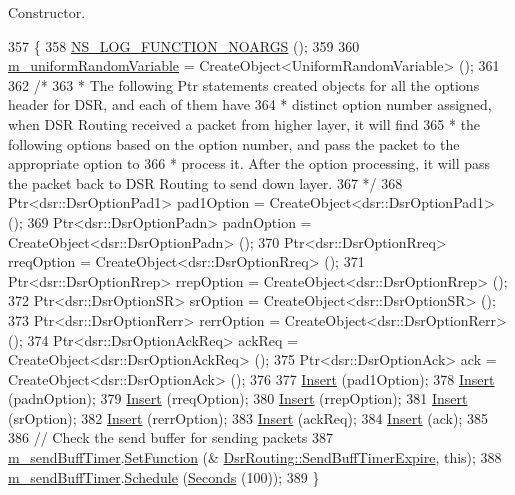 Constructor. 


\begin{DoxyCode}
357 \{
358   \hyperlink{log-macros-disabled_8h_a8f7e4afc291c9d29a65c18ac1f79197b}{NS\_LOG\_FUNCTION\_NOARGS} ();
359 
360   \hyperlink{classns3_1_1dsr_1_1DsrRouting_a22a85b3510166ffdd451e4010f996f0f}{m\_uniformRandomVariable} = CreateObject<UniformRandomVariable> ();
361 
362   \textcolor{comment}{/*}
363 \textcolor{comment}{   * The following Ptr statements created objects for all the options header for DSR, and each of them have}
364 \textcolor{comment}{   * distinct option number assigned, when DSR Routing received a packet from higher layer, it will find}
365 \textcolor{comment}{   * the following options based on the option number, and pass the packet to the appropriate option to}
366 \textcolor{comment}{   * process it. After the option processing, it will pass the packet back to DSR Routing to send down
       layer.}
367 \textcolor{comment}{   */}
368   Ptr<dsr::DsrOptionPad1> pad1Option = CreateObject<dsr::DsrOptionPad1> ();
369   Ptr<dsr::DsrOptionPadn> padnOption = CreateObject<dsr::DsrOptionPadn> ();
370   Ptr<dsr::DsrOptionRreq> rreqOption = CreateObject<dsr::DsrOptionRreq> ();
371   Ptr<dsr::DsrOptionRrep> rrepOption = CreateObject<dsr::DsrOptionRrep> ();
372   Ptr<dsr::DsrOptionSR>   srOption = CreateObject<dsr::DsrOptionSR> ();
373   Ptr<dsr::DsrOptionRerr>   rerrOption = CreateObject<dsr::DsrOptionRerr> ();
374   Ptr<dsr::DsrOptionAckReq> ackReq = CreateObject<dsr::DsrOptionAckReq> ();
375   Ptr<dsr::DsrOptionAck> ack = CreateObject<dsr::DsrOptionAck> ();
376 
377   \hyperlink{classns3_1_1dsr_1_1DsrRouting_af84bc8969d7d9e4ff167cab6bca88ce0}{Insert} (pad1Option);
378   \hyperlink{classns3_1_1dsr_1_1DsrRouting_af84bc8969d7d9e4ff167cab6bca88ce0}{Insert} (padnOption);
379   \hyperlink{classns3_1_1dsr_1_1DsrRouting_af84bc8969d7d9e4ff167cab6bca88ce0}{Insert} (rreqOption);
380   \hyperlink{classns3_1_1dsr_1_1DsrRouting_af84bc8969d7d9e4ff167cab6bca88ce0}{Insert} (rrepOption);
381   \hyperlink{classns3_1_1dsr_1_1DsrRouting_af84bc8969d7d9e4ff167cab6bca88ce0}{Insert} (srOption);
382   \hyperlink{classns3_1_1dsr_1_1DsrRouting_af84bc8969d7d9e4ff167cab6bca88ce0}{Insert} (rerrOption);
383   \hyperlink{classns3_1_1dsr_1_1DsrRouting_af84bc8969d7d9e4ff167cab6bca88ce0}{Insert} (ackReq);
384   \hyperlink{classns3_1_1dsr_1_1DsrRouting_af84bc8969d7d9e4ff167cab6bca88ce0}{Insert} (ack);
385 
386   \textcolor{comment}{// Check the send buffer for sending packets}
387   \hyperlink{classns3_1_1dsr_1_1DsrRouting_a7676aff7f691319b764fba26a726ef5d}{m\_sendBuffTimer}.\hyperlink{classns3_1_1Timer_a044b29030c9de99298d51ac0ccfc104c}{SetFunction} (&
      \hyperlink{classns3_1_1dsr_1_1DsrRouting_a10273aec775b5cf12eafb03ee46c4397}{DsrRouting::SendBuffTimerExpire}, \textcolor{keyword}{this});
388   \hyperlink{classns3_1_1dsr_1_1DsrRouting_a7676aff7f691319b764fba26a726ef5d}{m\_sendBuffTimer}.\hyperlink{classns3_1_1Timer_ac3345d696887578f518b19f359f7f94b}{Schedule} (\hyperlink{group__timecivil_ga33c34b816f8ff6628e33d5c8e9713b9e}{Seconds} (100));
389 \}
\end{DoxyCode}


